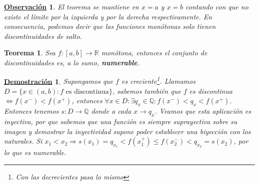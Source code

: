 \documentclass[10pt,a4paper,openright]{book}
\theoremstyle{break}
\newtheorem{theo}{Teorema}[chapter]
\newtheorem*{demo}{\underline{Demostración}}
\newtheorem{obs}{\underline{Observación}}[chapter]
\begin{document}
\begin{obs}
El teorema se mantiene en $x=a$ y $x=b$ contando con que no existe el límite por la izquierda y por la derecha respectivamente. En consecuencia, podemos decir que las funciones monótonas solo tienen discontinuidades de salto.
\end{obs}

\begin{theo}
Sea $f:[a,b]\rightarrow \mathbb R$ monótona, entonces el conjunto de discontinuidades es, a lo sumo, \textbf{numerable}.
\end{theo}
\begin{demo}
Supongamos que $f$ es creciente\footnote{Con las decrecientes pasa lo mismo}. Llamamos $D=\{x\in (a,b): f \mbox{ es discontinua}\}$, sabemos también que $f$ es discontinua $\Leftrightarrow f(x^-)< f(x^+)$, entonces $\forall x \in D: \exists q_x\in \mathbb Q: f(x^-)<q_x<f(x^+)$. Entonces tenemos $s:D \rightarrow \mathbb Q$ donde a cada $x\rightarrow q_x$. Veamos que esta aplicación es inyectiva, por que sabemos que una función es siempre suprayectiva sobre su imagen y demostrar la inyectividad supone poder establecer una biyección con los naturales. Si $x_1<x_2\Rightarrow s(x_1)=q_{x_1}<f(x_1^+)\leq f(x_2^-)< q_{x_2}=s(x_2)$, por lo que es numerable.
\end{demo}
\end{document}
